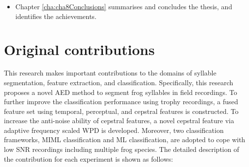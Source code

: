 \begin{itemize}


\item  Chapter \ref{cha:cha8Conclusions} summarises and concludes the thesis, and identifies the achievements.

\end{itemize}

\section{Original contributions}
This research makes important contributions to the domains of syllable segmentation, feature extraction, and classification. Specifically, this research proposes a novel AED method to segment frog syllables in field recordings. To further improve the classification performance using trophy recordings, a fused feature set using temporal, perceptual, and cepstral features is constructed. To increase the anti-noise ability of cepstral features, a novel cepstral feature via adaptive frequency scaled WPD is developed. Moreover, two classification frameworks, MIML classification and ML classification, are adopted to cope with low SNR recordings including multiple frog species. The detailed description of the contribution for each experiment is shown as follows:

